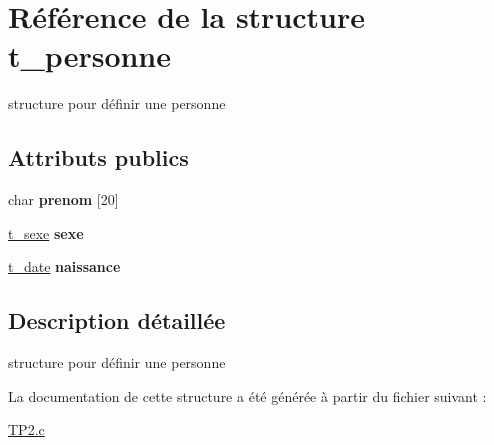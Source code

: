 \hypertarget{structt__personne}{\section{Référence de la structure t\-\_\-personne}
\label{structt__personne}
}


structure pour définir une personne  


\subsection*{Attributs publics}
\begin{DoxyCompactItemize}
\item 
\hypertarget{structt__personne_ae5321c6490c39f18e45d71c30ac7970a}{char {\bfseries prenom} \mbox{[}20\mbox{]}}\label{structt__personne_ae5321c6490c39f18e45d71c30ac7970a}

\item 
\hypertarget{structt__personne_a5f2771d87c08ac730580ed29cd339248}{\hyperlink{TP2_8c_ab79b8b73374184bdb09815f42faf71d2}{t\-\_\-sexe} {\bfseries sexe}}\label{structt__personne_a5f2771d87c08ac730580ed29cd339248}

\item 
\hypertarget{structt__personne_a6781f9eeea9f1117a29220f42a4accda}{\hyperlink{structt__date}{t\-\_\-date} {\bfseries naissance}}\label{structt__personne_a6781f9eeea9f1117a29220f42a4accda}

\end{DoxyCompactItemize}


\subsection{Description détaillée}
structure pour définir une personne 

La documentation de cette structure a été générée à partir du fichier suivant \-:\begin{DoxyCompactItemize}
\item 
\hyperlink{TP2_8c}{T\-P2.\-c}\end{DoxyCompactItemize}
